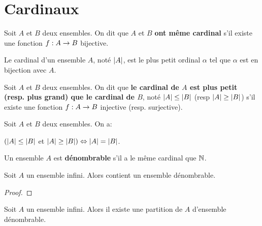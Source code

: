 \chapter{Cardinaux}


\begin{definition}
	Soit $A$ et $B$ deux ensembles.
	On dit que $A$ et $B$ \textbf{ont même cardinal} s'il existe une fonction
	$f : A \rightarrow B$ bijective.
\end{definition}

\begin{definition}
	Le cardinal d'un ensemble $A$, noté $|A|$, est le plus petit ordinal
	$\alpha$ tel que $\alpha$ est en bijection avec $A$.
\end{definition}

\begin{definition}
	Soit $A$ et $B$ deux ensembles. On dit que \textbf{le cardinal de $A$ est
	plus petit (resp. plus grand) que le cardinal de $B$}, noté $|A| \leq
	|B|$ (resp $|A| \geq |B|$) s'il existe une fonction
	$f : A \rightarrow B$ injective (resp. surjective).
\end{definition}

\begin{theorem} 
	Soit $A$ et $B$ deux ensembles. On a:

	$(|A| \leq |B|$ et $|A| \geq |B|) \Leftrightarrow |A| =
	|B|$.
	\label{thm:csb}
\end{theorem}

\begin{definition}
	Un ensemble $A$ est \textbf{dénombrable} s'il a le même cardinal que
	$\mathbb{N}$.
\end{definition}

\begin{proposition}
	Soit $A$ un ensemble infini. Alors contient un ensemble dénombrable.
\end{proposition}

\ifdefined\outputproof
\begin{proof}

\end{proof}
\fi

\begin{proposition}
	\label{prop:infinite_set_partition}
	Soit $A$ un ensemble infini. Alors il existe une partition de $A$ d'ensemble
	dénombrable.
\end{proposition}

